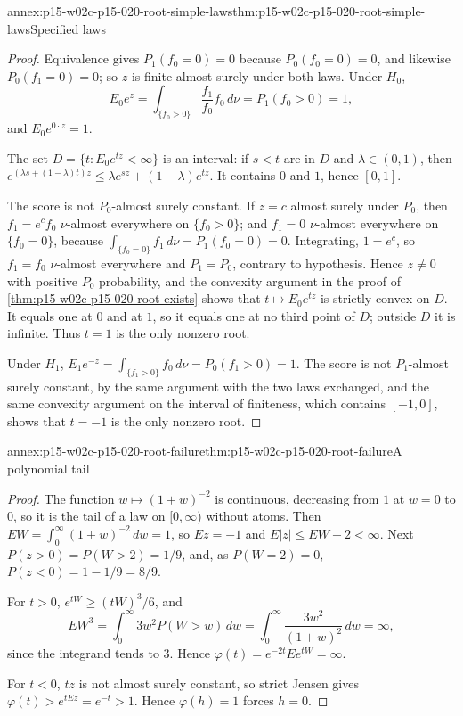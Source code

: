 \begin{annexitem}{annex:p15-w02c-p15-020-root-simple-laws}{thm:p15-w02c-p15-020-root-simple-laws}{Specified laws}
\begin{proof}
Equivalence gives \(P_1(f_0=0)=0\) because \(P_0(f_0=0)=0\), and
likewise \(P_0(f_1=0)=0\); so \(z\) is finite almost surely under both
laws. Under \(H_0\),
\[
 E_0e^{z}=\int_{\{f_0>0\}}\frac{f_1}{f_0}f_0\,d\nu
 =P_1(f_0>0)=1,
\]
and \(E_0e^{0\cdot z}=1\).

The set \(D=\{t:E_0e^{tz}<\infty\}\) is an interval: if \(s<t\) are in
\(D\) and \(\lambda\in(0,1)\), then
\(e^{(\lambda s+(1-\lambda)t)z}\leq\lambda e^{sz}+(1-\lambda)e^{tz}\).
It contains \(0\) and \(1\), hence \([0,1]\).

The score is not \(P_0\)-almost surely constant. If \(z=c\) almost
surely under \(P_0\), then \(f_1=e^cf_0\) \(\nu\)-almost everywhere on
\(\{f_0>0\}\); and \(f_1=0\) \(\nu\)-almost everywhere on \(\{f_0=0\}\),
because \(\int_{\{f_0=0\}}f_1\,d\nu=P_1(f_0=0)=0\). Integrating,
\(1=e^c\), so \(f_1=f_0\) \(\nu\)-almost everywhere and \(P_1=P_0\),
contrary to hypothesis. Hence \(z\neq0\) with positive \(P_0\)
probability, and the convexity argument in the proof of
\cref{thm:p15-w02c-p15-020-root-exists} shows that
\(t\mapsto E_0e^{tz}\) is strictly convex on \(D\). It equals one at
\(0\) and at \(1\), so it equals one at no third point of \(D\); outside
\(D\) it is infinite. Thus \(t=1\) is the only nonzero root.

Under \(H_1\), \(E_1e^{-z}=\int_{\{f_1>0\}}f_0\,d\nu=P_0(f_1>0)=1\).
The score is not \(P_1\)-almost surely constant, by the same argument
with the two laws exchanged, and the same convexity argument on the
interval of finiteness, which contains \([-1,0]\), shows that \(t=-1\)
is the only nonzero root.
\end{proof}
\end{annexitem}

\begin{annexitem}{annex:p15-w02c-p15-020-root-failure}{thm:p15-w02c-p15-020-root-failure}{A polynomial tail}
\begin{proof}
The function \(w\mapsto(1+w)^{-2}\) is continuous, decreasing from
\(1\) at \(w=0\) to \(0\), so it is the tail of a law on
\([0,\infty)\) without atoms. Then
\(EW=\int_0^\infty(1+w)^{-2}\,dw=1\), so \(Ez=-1\) and
\(E|z|\leq EW+2<\infty\). Next \(P(z>0)=P(W>2)=1/9\), and, as
\(P(W=2)=0\), \(P(z<0)=1-1/9=8/9\).

For \(t>0\), \(e^{tW}\geq(tW)^3/6\), and
\[
 EW^3=\int_0^\infty3w^2P(W>w)\,dw=\int_0^\infty\frac{3w^2}{(1+w)^2}\,dw=\infty,
\]
since the integrand tends to \(3\). Hence
\(\varphi(t)=e^{-2t}Ee^{tW}=\infty\).

For \(t<0\), \(tz\) is not almost surely constant, so strict Jensen
gives \(\varphi(t)>e^{tEz}=e^{-t}>1\). Hence \(\varphi(h)=1\) forces
\(h=0\).
\end{proof}
\end{annexitem}

